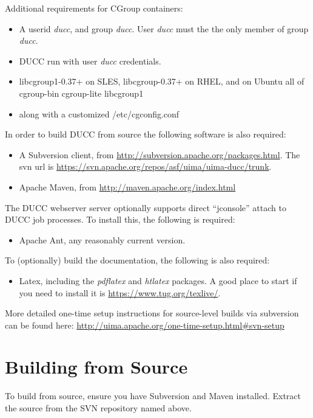 Additional requirements for CGroup containers:

\begin{itemize}
  \item A userid {\em ducc}, and group {\em ducc}.  User {\em ducc} must the the only member of group {\em ducc}.
  \item DUCC run with user {\em ducc} credentials.
  \item libcgroup1-0.37+ on SLES, libcgroup-0.37+ on RHEL, and on Ubuntu all of cgroup-bin cgroup-lite libcgroup1
  \item along with a customized /etc/cgconfig.conf
\end{itemize}

  
In order to build DUCC from source the following software is also required:
\begin{itemize}
    \item A Subversion client, from \url{http://subversion.apache.org/packages.html}.  The
      svn url is \url{https://svn.apache.org/repos/asf/uima/uima-ducc/trunk}.
    \item Apache Maven, from \url{http://maven.apache.org/index.html}
\end{itemize}

The DUCC webserver server optionally supports direct ``jconsole'' attach to DUCC job processes.  To install
this, the following is required:
\begin{itemize}
    \item Apache Ant, any reasonably current version.
\end{itemize}
    
To (optionally) build the documentation, the following is also required:
\begin{itemize}
  \item Latex, including the \emph{pdflatex} and \emph{htlatex} packages.  A good place
    to start if you need to install it is \url{https://www.tug.org/texlive/}.
\end{itemize}

More detailed one-time setup instructions for source-level builds via subversion can be found here:
\url{http://uima.apache.org/one-time-setup.html\#svn-setup}

\section{Building from Source}

To build from source, ensure you have
Subversion and Maven installed.  Extract the source from the SVN repository named above. 

